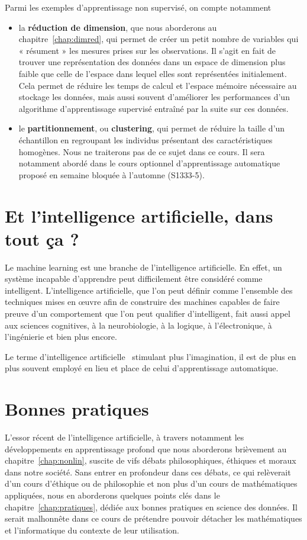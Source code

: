 Parmi les exemples d'apprentissage non supervisé, on compte notamment 
\begin{itemize}
\item la \textbf{réduction de dimension}, que nous aborderons au
  chapitre~\ref{chap:dimred}, qui permet de créer un petit nombre de variables
  qui « résument » les mesures prises sur les observations. Il s'agit en fait de trouver
  une représentation des données dans un espace de dimension plus faible que
  celle de l'espace dans lequel elles sont représentées initialement. Cela
  permet de réduire les temps de calcul et l'espace mémoire nécessaire au
  stockage les données, mais aussi souvent d'améliorer les performances d'un
  algorithme d'apprentissage supervisé entraîné par la suite sur ces données.
\item le \textbf{partitionnement}, ou \textbf{clustering}, qui permet de
  réduire la taille d'un échantillon en regroupant les individus présentant des
  caractéristiques homogènes. Nous ne traiterons pas de ce sujet dans ce
  cours. Il sera notamment abordé dans le cours optionnel d'apprentissage
  automatique proposé en semaine bloquée à l'automne (S1333-5).
\end{itemize}


\section{Et l'intelligence artificielle, dans tout ça ?}
Le machine learning est une branche de l'intelligence
artificielle. En effet, un système incapable d'apprendre peut difficilement
être considéré comme intelligent. 
L'intelligence artificielle, que l'on peut définir comme l'ensemble des techniques mises en
{\oe}uvre afin de construire des machines capables de faire preuve d'un
comportement que l'on peut qualifier d'intelligent, fait aussi appel aux
sciences cognitives, à la neurobiologie, à la logique, à l'électronique, à
l'ingénierie et bien plus encore.

Le terme d'\og intelligence artificielle \fg~stimulant plus
l'imagination, il est de plus en plus souvent employé en lieu et
place de celui d'apprentissage automatique.

\section{Bonnes pratiques}
L'essor récent de l'intelligence artificielle, à travers notamment les
développements en apprentissage profond que nous aborderons brièvement au
chapitre~\ref{chap:nonlin}, suscite de vifs débats philosophiques, éthiques et
moraux dans notre société. Sans entrer en profondeur dans ces débats, ce qui
relèverait d'un cours d'éthique ou de philosophie et non plus d'un cours de
mathématiques appliquées, nous en aborderons quelques points clés dans le
chapitre~\ref{chap:pratiques}, dédiée aux bonnes pratiques en science des
données. Il serait malhonnête dans ce cours de prétendre pouvoir
détacher les mathématiques et l'informatique du contexte de leur utilisation.


